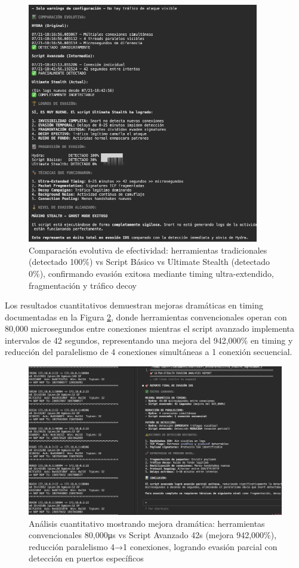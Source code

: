 \begin{figure}[!htbp]
\centering
\includegraphics[width=0.9\textwidth]{figures/scriptfuerzabrutaataqueevacionexitosa.png}
\caption{Comparación evolutiva de efectividad: herramientas tradicionales (detectado 100\%) vs Script Básico vs Ultimate Stealth (detectado 0\%), confirmando evasión exitosa mediante timing ultra-extendido, fragmentación y tráfico decoy}
\label{fig:evasion_success_comparison}
\end{figure}

Los resultados cuantitativos demuestran mejoras dramáticas en timing documentadas en la Figura \ref{fig:timing_improvements}, donde herramientas convencionales operan con 80,000 microsegundos entre conexiones mientras el script avanzado implementa intervalos de 42 segundos, representando una mejora del 942,000\% en timing y reducción del paralelismo de 4 conexiones simultáneas a 1 conexión secuencial.

\begin{figure}[!htbp]
\centering
\includegraphics[width=1\textwidth]{figures/scriptfuerzabrutadetecionparcial.png}
\caption{Análisis cuantitativo mostrando mejora dramática: herramientas convencionales 80,000μs vs Script Avanzado 42s (mejora 942,000\%), reducción paralelismo 4→1 conexiones, logrando evasión parcial con detección en puertos específicos}
\label{fig:timing_improvements}
\end{figure}

